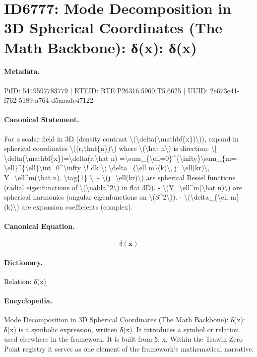 \section*{ID6777: Mode Decomposition in 3D Spherical Coordinates (The Math Backbone): δ(x): δ(x)}
\paragraph{Metadata.}
PiID: 5449597783779 | RTEID: RTE:P26316.5960:T5.6625 | UUID: 2e673e41-f762-5189-a764-d5aaade47122

\paragraph{Canonical Statement.}
For a scalar field in 3D (density contrast \textbackslash{}(\textbackslash{}delta(\textbackslash{}mathbf\{x\})\textbackslash{})), expand in spherical coordinates \textbackslash{}((r,\textbackslash{}hat\{n\})\textbackslash{}) where \textbackslash{}(\textbackslash{}hat n\textbackslash{}) is direction: \textbackslash{}[ \textbackslash{}delta(\textbackslash{}mathbf\{x\})=\textbackslash{}delta(r,\textbackslash{}hat n) =\textbackslash{}sum\_\{\textbackslash{}ell=0\}\textasciicircum{}\{\textbackslash{}infty\}\textbackslash{}sum\_\{m=-\textbackslash{}ell\}\textasciicircum{}\{\textbackslash{}ell\}\textbackslash{}int\_0\textasciicircum{}\textbackslash{}infty \textbackslash{}! dk \textbackslash{}; \textbackslash{}delta\_\{\textbackslash{}ell m\}(k)\textbackslash{}, j\_\textbackslash{}ell(kr)\textbackslash{}, Y\_\textbackslash{}ell\textasciicircum{}m(\textbackslash{}hat n). \textbackslash{}tag\{1\} \textbackslash{}] - \textbackslash{}(j\_\textbackslash{}ell(kr)\textbackslash{}) are spherical Bessel functions (radial eigenfunctions of \textbackslash{}(\textbackslash{}nabla\textasciicircum{}2\textbackslash{}) in flat 3D). - \textbackslash{}(Y\_\textbackslash{}ell\textasciicircum{}m(\textbackslash{}hat n)\textbackslash{}) are spherical harmonics (angular eigenfunctions on \textbackslash{}(S\textasciicircum{}2\textbackslash{})). - \textbackslash{}(\textbackslash{}delta\_\{\textbackslash{}ell m\}(k)\textbackslash{}) are expansion coefficients (complex).

\paragraph{Canonical Equation.}
\[
\delta(\mathbf{x})
\]

\paragraph{Dictionary.}
Relation: δ(x)

\paragraph{Encyclopedia.}
Mode Decomposition in 3D Spherical Coordinates (The Math Backbone): δ(x): δ(x) is a symbolic expression, written δ(x). It introduces a symbol or relation used elsewhere in the framework. It is built from δ, x. Within the Trawin Zero Point registry it serves as one element of the framework's mathematical narrative.
